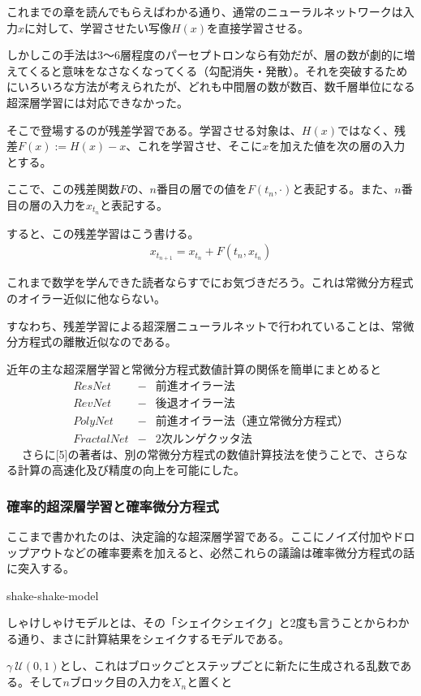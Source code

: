 \documentclass[dvipdfmx, a4paper]{jsarticle}
\begin{document}
これまでの章を読んでもらえばわかる通り、通常のニューラルネットワークは入力$x$に対して、学習させたい写像$H(x)$を直接学習させる。

しかしこの手法は3～6層程度のパーセプトロンなら有効だが、層の数が劇的に増えてくると意味をなさなくなってくる（勾配消失・発散）。それを突破するためにいろいろな方法が考えられたが、どれも中間層の数が数百、数千層単位になる超深層学習には対応できなかった。

そこで登場するのが残差学習である。学習させる対象は、$H(x)$ではなく、残差$F(x):=H(x)-x$、これを学習させ、そこに$x$を加えた値を次の層の入力とする。

ここで、この残差関数$F$の、$n$番目の層での値を$F(t_n,\cdot)$と表記する。また、$n$番目の層の入力を$x_{t_n}$と表記する。

すると、この残差学習はこう書ける。
\begin{align}
x_{t_{n+1}}=x_{t_n}+F(t_n,x_{t_n})
\end{align}

これまで数学を学んできた読者ならすでにお気づきだろう。これは常微分方程式のオイラー近似に他ならない。

すなわち、残差学習による超深層ニューラルネットで行われていることは、常微分方程式の離散近似なのである。

近年の主な超深層学習と常微分方程式数値計算の関係を簡単にまとめると
\begin{align}
ResNet &-& 前進オイラー法\\
RevNet &-& 後退オイラー法\\
PolyNet &-& 前進オイラー法（連立常微分方程式）\\
FractalNet &-& 2次ルンゲクッタ法
\end{align}　
さらに[5]の著者は、別の常微分方程式の数値計算技法を使うことで、さらなる計算の高速化及び精度の向上を可能にした。

\subsubsection{確率的超深層学習と確率微分方程式}
ここまで書かれたのは、決定論的な超深層学習である。ここにノイズ付加やドロップアウトなどの確率要素を加えると、必然これらの議論は確率微分方程式の話に突入する。

shake-shake-model

しゃけしゃけモデルとは、その「シェイクシェイク」と2度も言うことからわかる通り、まさに計算結果をシェイクするモデルである。

$\gamma~\mathcal{U}(0,1)$とし、これはブロックごとステップごとに新たに生成される乱数である。そして$n$ブロック目の入力を$X_n$と置くと
\end{document}
